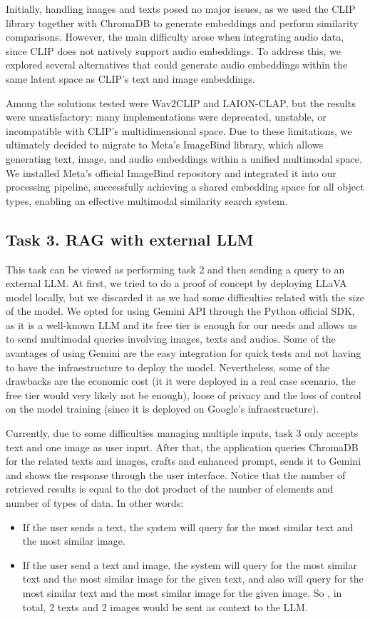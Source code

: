 \documentclass[12pt]{article}
\begin{document}
Initially, handling images and texts posed no major issues, as we used the CLIP library together with ChromaDB to generate embeddings and perform similarity comparisons.
However, the main difficulty arose when integrating audio data, since CLIP does not natively support audio embeddings. To address this, we explored several alternatives that could generate audio embeddings within the same latent space as CLIP’s text and image embeddings.

Among the solutions tested were Wav2CLIP and LAION-CLAP, but the results were unsatisfactory: many implementations were deprecated, unstable, or incompatible with CLIP’s multidimensional space.
Due to these limitations, we ultimately decided to migrate to Meta’s ImageBind library, which allows generating text, image, and audio embeddings within a unified multimodal space.
We installed Meta’s official ImageBind repository and integrated it into our processing pipeline, successfully achieving a shared embedding space for all object types, enabling an effective multimodal similarity search system.

\subsection{Task 3. RAG with external LLM}
This task can be viewed as performing task 2 and then sending a query to an external LLM. At first, we tried to do a proof of concept by deploying LLaVA model locally, but we discarded it as we had some difficulties related with the size of the model. We opted for using Gemini API through the Python official SDK, as it is a well-known LLM and its free tier is enough for our needs and allows us to send multimodal queries involving images, texts and audios. Some of the avantages of using Gemini are the easy integration for quick tests and not having to have the infraestructure to deploy the model. Nevertheless, some of the drawbacks are the economic cost (it it were deployed in a real case scenario, the free tier would very likely not be enough), loose of privacy and the loss of control on the model training (since it is deployed on Google's infraestructure).

Currently, due to some difficulties managing multiple inputs, task 3 only accepts text and one image as user input. After that, the application queries ChromaDB for the related texts and images, crafts and enhanced prompt, sends it to Gemini and shows the response through the user interface. Notice that the number of retrieved results is equal to the dot product of the number of elements and number of types of data. In other words:
\begin{itemize}
    \item If the user sends a text, the system will query for the most similar text and the most similar image.
    \item If the user send a text and image, the system will query for the most similar text and the most similar image for the given text, and also will query for the most similar text and the most similar image for the given image. So , in total, 2 texts and 2 images would be sent as context to the LLM.
\end{itemize}
\end{document}
